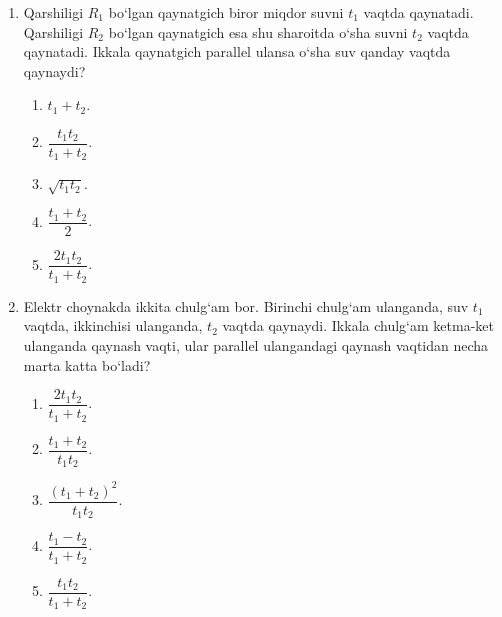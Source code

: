 \begin{enumerate}

\begin{enumerate}[label=\Alph*)]
\item $R_1$ da.
\item $R_2$ da.
\item $R_3$ da.
\item $R_4$ da.
\item hammasida bir xil.
\end{enumerate}

\item Qarshiligi $R_1$ bo‘lgan qaynatgich biror miqdor suvni $t_1$ vaqtda qaynatadi. Qarshiligi $R_2$ bo‘lgan qaynatgich esa shu sharoitda o‘sha suvni $t_2$ vaqtda qaynatadi. Ikkala qaynatgich parallel ulansa o‘sha suv qanday vaqtda qaynaydi?
\begin{enumerate}[label=\Alph*)]
\item $t_1+t_2$.
\item $\dfrac{t_1t_2}{t_1+t_2}$.
\item $\sqrt{t_1t_2}$.
\item $\dfrac{t_1+t_2}{2}$.
\item $\dfrac{2t_1t_2}{t_1+t_2}$.
\end{enumerate}

\item Elektr choynakda ikkita chulg‘am bor. Birinchi chulg‘am ulanganda, suv $t_1$ vaqtda, ikkinchisi ulanganda, $t_2$ vaqtda qaynaydi. Ikkala chulg‘am ketma-ket ulanganda qaynash vaqti, ular parallel ulangandagi qaynash vaqtidan necha marta katta bo‘ladi?
\begin{enumerate}[label=\Alph*)]
\item $\dfrac{2t_1t_2}{t_1+t_2}$.
\item $\dfrac{t_1+t_2}{t_1t_2}$.
\item $\dfrac{(t_1+t_2)^2}{t_1t_2}$.
\item $\dfrac{t_1-t_2}{t_1+t_2}$.
\item $\dfrac{t_1t_2}{t_1+t_2}$.
\end{enumerate}


\end{enumerate}
